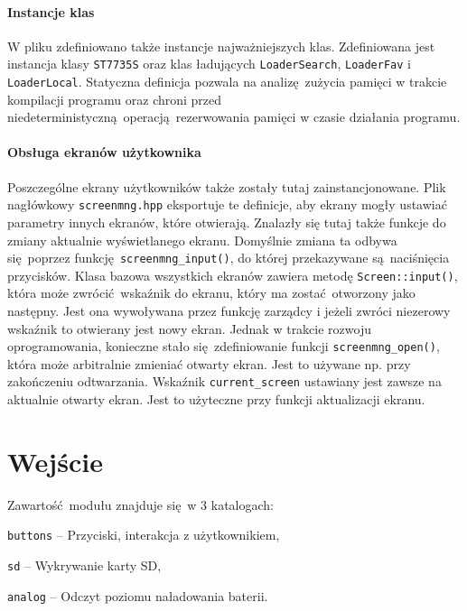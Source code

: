 \documentclass[polish]{aghengthesis}
\let\tempone\itemize
\let\temptwo\enditemize
\renewenvironment{itemize}{\tempone\setlength{\itemsep}{0cm}}{\temptwo}
\begin{document}
			\paragraph{Instancje klas}
				W pliku zdefiniowano także instancje najważniejszych klas. Zdefiniowana jest instancja klasy \lstinline|ST7735S| oraz klas ładujących \lstinline|LoaderSearch|, \lstinline|LoaderFav| i \lstinline|LoaderLocal|. Statyczna definicja pozwala na analizę zużycia pamięci w trakcie kompilacji programu oraz chroni przed niedeterministyczną operacją rezerwowania pamięci w czasie działania programu.
				
			\paragraph{Obsługa ekranów użytkownika}
				Poszczególne ekrany użytkowników także zostały tutaj zainstancjonowane. Plik nagłówkowy \lstinline|screenmng.hpp| eksportuje te definicje, aby ekrany mogły ustawiać parametry innych ekranów, które otwierają. Znalazły się tutaj także funkcje do zmiany aktualnie wyświetlanego ekranu. Domyślnie zmiana ta odbywa się poprzez funkcję \lstinline|screenmng_input()|, do której przekazywane są naciśnięcia przycisków. Klasa bazowa wszystkich ekranów zawiera metodę \lstinline|Screen::input()|, która może zwrócić wskaźnik do ekranu, który ma zostać otworzony jako następny. Jest ona wywoływana przez funkcję zarządcy i jeżeli zwróci niezerowy wskaźnik to otwierany jest nowy ekran. Jednak w trakcie rozwoju oprogramowania, konieczne stało się zdefiniowanie funkcji \lstinline|screenmng_open()|, która może arbitralnie zmieniać otwarty ekran. Jest to używane np. przy zakończeniu odtwarzania. Wskaźnik \lstinline|current_screen| ustawiany jest zawsze na aktualnie otwarty ekran. Jest to użyteczne przy funkcji aktualizacji ekranu.

	\section{Wejście}
		\noindent
		Zawartość modułu znajduje się w 3 katalogach:
		\begin{itemize}
			\item \lstinline|buttons| -- Przyciski, interakcja z użytkownikiem,
			\item \lstinline|sd| -- Wykrywanie karty SD,
			\item \lstinline|analog| -- Odczyt poziomu naładowania baterii.
		\end{itemize}
		
\end{document}
